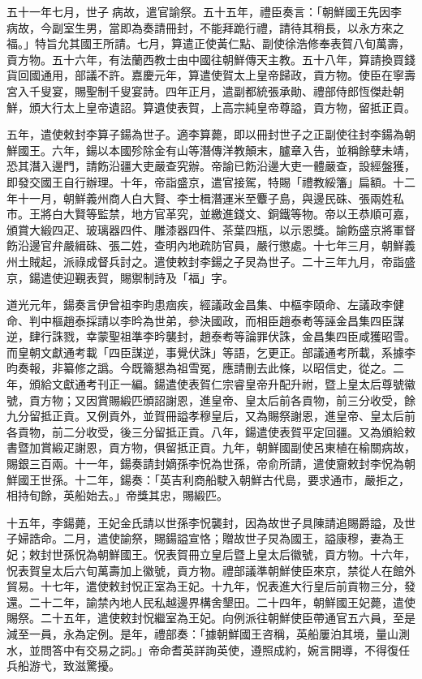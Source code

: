\begin{pinyinscope}
五十一年七月，世子病故，遣官諭祭。五十五年，禮臣奏言：「朝鮮國王先因李病故，今副室生男，當即為奏請冊封，不能拜跪行禮，請待其稍長，以永方來之福。」特旨允其國王所請。七月，算遣正使黃仁點、副使徐浩修奉表賀八旬萬壽，貢方物。五十六年，有法蘭西教士由中國往朝鮮傳天主教。五十八年，算請換買錢貨回國通用，部議不許。嘉慶元年，算遣使賀太上皇帝歸政，貢方物。使臣在寧壽宮入千叟宴，賜聖制千叟宴詩。四年正月，遣副都統張承勛、禮部侍郎恆傑赴朝鮮，頒大行太上皇帝遺詔。算遺使表賀，上高宗純皇帝尊謚，貢方物，留抵正貢。

五年，遣使敕封李算子鍚為世子。適李算薨，即以冊封世子之正副使往封李鍚為朝鮮國王。六年，鍚以本國殄除金有山等潛傳洋教顛末，臚章入告，並稱餘孽未靖，恐其潛入邊門，請飭沿疆大吏嚴查究辦。帝諭已飭沿邊大吏一體嚴查，設經盤獲，即發交國王自行辦理。十年，帝詣盛京，遣官接駕，特賜「禮教綏籓」扁額。十二年十一月，朝鮮義州商人白大賢、李士楫潛運米至麞子島，與邊民硃、張兩姓私市。王將白大賢等監禁，地方官革究，並繳進錢文、銅鐵等物。帝以王恭順可嘉，頒賞大緞四疋、玻璃器四件、雕漆器四件、茶葉四瓶，以示恩獎。諭飭盛京將軍督飭沿邊官弁嚴緝硃、張二姓，查明內地疏防官員，嚴行懲處。十七年三月，朝鮮義州土賊起，派祿成督兵討之。遣使敕封李鍚之子炅為世子。二十三年九月，帝詣盛京，鍚遣使迎覲表賀，賜禦制詩及「福」字。

道光元年，鍚奏言伊曾祖李昀患痼疾，經議政金昌集、中樞李頤命、左議政李健命、判中樞趙泰採請以李昑為世弟，參決國政，而相臣趙泰耇等誣金昌集四臣謀逆，肆行誅戮，幸蒙聖祖準李昑襲封，趙泰耇等論罪伏誅，金昌集四臣咸獲昭雪。而皇朝文獻通考載「四臣謀逆，事覺伏誅」等語，乞更正。部議通考所載，系據李昀奏報，非纂修之譌。今既籥懇為祖雪冤，應請刪去此條，以昭信史，從之。二年，頒給文獻通考刊正一編。鍚遣使表賀仁宗睿皇帝升配升祔，暨上皇太后尊號徽號，貢方物；又因賞賜緞匹頒詔謝恩，進皇帝、皇太后前各貢物，前三分收受，餘九分留抵正貢。又例貢外，並賀冊謚孝穆皇后，又為賜祭謝恩，進皇帝、皇太后前各貢物，前二分收受，後三分留抵正貢。八年，鍚遣使表賀平定回疆。又為頒給敕書暨加賞緞疋謝恩，貢方物，俱留抵正貢。九年，朝鮮國副使呂東植在榆關病故，賜銀三百兩。十一年，鍚奏請封嫡孫李怳為世孫，帝俞所請，遣使齎敕封李怳為朝鮮國王世孫。十二年，鍚奏：「英吉利商船駛入朝鮮古代島，要求通市，嚴拒之，相持旬餘，英船始去。」帝獎其忠，賜緞匹。

十五年，李鍚薨，王妃金氏請以世孫李怳襲封，因為故世子具陳請追賜爵謚，及世子婦誥命。二月，遣使諭祭，賜鍚謚宣恪；贈故世子炅為國王，謚康穆，妻為王妃；敕封世孫怳為朝鮮國王。怳表賀冊立皇后暨上皇太后徽號，貢方物。十六年，怳表賀皇太后六旬萬壽加上徽號，貢方物。禮部議準朝鮮使臣來京，禁從人在館外貿易。十七年，遣使敕封怳正室為王妃。十九年，怳表進大行皇后前貢物三分，發還。二十二年，諭禁內地人民私越邊界構舍墾田。二十四年，朝鮮國王妃薨，遣使賜祭。二十五年，遣使敕封怳繼室為王妃。向例派往朝鮮使臣帶通官五六員，至是減至一員，永為定例。是年，禮部奏：「據朝鮮國王咨稱，英船屢泊其境，量山測水，並問答中有交易之詞。」帝命耆英詳詢英使，遵照成約，婉言開導，不得復任兵船游弋，致滋驚擾。


\end{pinyinscope}
